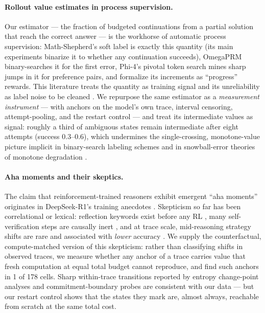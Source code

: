 \paragraph{Rollout value estimates in process supervision.}
Our estimator --- the fraction of budgeted continuations from a partial
solution that reach the correct answer --- is the workhorse of automatic
process supervision: Math-Shepherd's soft label \citep{wang2024mathshepherd}
is exactly this quantity (its main experiments binarize it to whether any
continuation succeeds), OmegaPRM \citep{luo2024omegaprm} binary-searches
it for the first error, Phi-4's pivotal token search \citep{abdin2024phi4}
mines sharp jumps in it for preference pairs, and \citet{setlur2025progress}
formalize its increments as ``progress'' rewards. This literature treats the
quantity as training signal and its unreliability as label noise to be cleaned
\citep{zhang2025prmlessons}. We repurpose the same estimator as a
\emph{measurement instrument} --- with anchors on the model's own trace,
interval censoring, attempt-pooling, and the restart control --- and treat
its intermediate values as signal: roughly a third of ambiguous states
remain intermediate after eight attempts (success 0.3--0.6), which
undermines
the single-crossing, monotone-value picture implicit in binary-search
labeling schemes \citep{luo2024omegaprm} and in snowball-error theories of
monotone degradation \citep{gan2025snowball}.

\paragraph{Aha moments and their skeptics.}
The claim that reinforcement-trained reasoners exhibit emergent ``aha
moments'' originates in DeepSeek-R1's training anecdotes
\citep{deepseekr1}. Skepticism so far has been correlational or
lexical: reflection keywords exist before any RL \citep{liu2025noaha},
many self-verification steps are causally inert \citep{zhao2025fakeaha,
kang2025firsttry}, and at trace scale, mid-reasoning strategy shifts are
rare and associated with \emph{lower} accuracy \citep{daliberti2026illusion}.
We supply the counterfactual, compute-matched version of this skepticism:
rather than classifying shifts in observed traces, we measure whether any
anchor of a trace carries value that fresh computation at equal total budget
cannot reproduce, and find such anchors in 1 of 178 cells. Sharp
within-trace transitions reported by entropy change-point analyses
\citep{xu2026entropy} and commitment-boundary probes \citep{scalena2026}
are consistent with our data --- but our restart control shows that the
states they mark are, almost always, reachable from scratch at the same
total cost.

